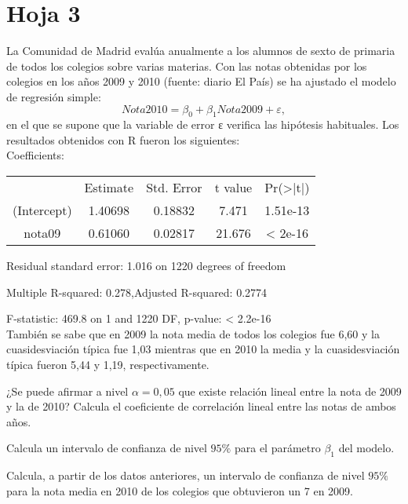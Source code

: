 



\section{Hoja 3}
\begin{problem}[1] La Comunidad de Madrid evalúa anualmente a los alumnos de sexto de primaria de todos los colegios sobre varias materias. Con las notas obtenidas por los colegios en los años 2009 y 2010 (fuente: diario El País) se ha ajustado el modelo de regresión simple:
\[Nota2010 = β_0 + β_1Nota2009 + ε,\]
en el que se supone que la variable de error ε verifica las hipótesis habituales. Los resultados
obtenidos con R fueron los siguientes:\\[1em]

Coefficients:

\begin{tabular}{c | c | c | c | c}
	~ & Estimate & Std. Error & t value & Pr(>|t|) \\
	(Intercept) & 1.40698 & 0.18832 & 7.471 & 1.51e-13 \\
	nota09 & 0.61060  & 0.02817 & 21.676 & < 2e-16
\end{tabular}

 Residual standard error: 1.016 on 1220 degrees of freedom

 Multiple R-squared: 0.278,Adjusted R-squared: 0.2774

 F-statistic: 469.8 on 1 and 1220 DF,  p-value: < 2.2e-16 \\[1em]

También se sabe que en 2009 la nota media de todos los colegios fue 6,60 y la cuasidesviación típica fue 1,03 mientras que en 2010 la media y la cuasidesviación típica fueron 5,44 y 1,19, respectivamente.

\ppart ¿Se puede afirmar a nivel $α = 0,05$ que existe relación lineal entre la nota de 2009 y la de 2010? Calcula el coeficiente de correlación lineal entre las notas de ambos años.

\ppart Calcula un intervalo de confianza de nivel $95\%$ para el parámetro $β_1$ del modelo.

\ppart Calcula, a partir de los datos anteriores, un intervalo de confianza de nivel $95\%$ para la nota
media en 2010 de los colegios que obtuvieron un 7 en 2009.



\end{problem}
